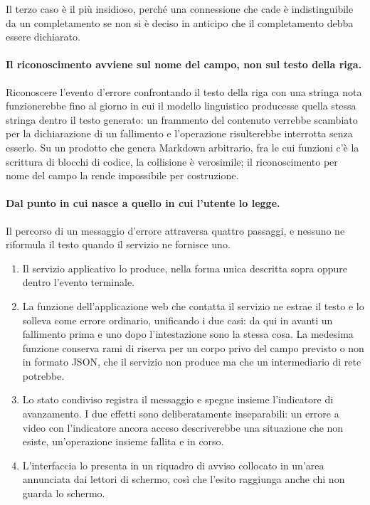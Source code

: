 \documentclass[a4paper, 10pt]{article}
\begin{document}
\noindent Il terzo caso è il più insidioso, perché una connessione che cade è indistinguibile da un completamento se non si è deciso in anticipo che il completamento debba essere dichiarato.

\paragraph{Il riconoscimento avviene sul nome del campo, non sul testo della riga.}
Riconoscere l'evento d'errore confrontando il testo della riga con una stringa nota funzionerebbe fino al giorno in cui il modello linguistico producesse quella stessa stringa dentro il testo generato: un frammento del contenuto verrebbe scambiato per la dichiarazione di un fallimento e l'operazione risulterebbe interrotta senza esserlo. Su un prodotto che genera Markdown arbitrario, fra le cui funzioni c'è la scrittura di blocchi di codice, la collisione è verosimile; il riconoscimento per nome del campo la rende impossibile per costruzione.

\paragraph{Dal punto in cui nasce a quello in cui l'utente lo legge.}
Il percorso di un messaggio d'errore attraversa quattro passaggi, e nessuno ne riformula il testo quando il servizio ne fornisce uno.

\begin{enumerate}
    \setlength{\itemsep}{3pt}
    \item Il servizio applicativo lo produce, nella forma unica descritta sopra oppure dentro l'evento terminale.
    \item La funzione dell'applicazione web che contatta il servizio ne estrae il testo e lo solleva come errore ordinario, unificando i due casi: da qui in avanti un fallimento prima e uno dopo l'intestazione sono la stessa cosa. La medesima funzione conserva rami di riserva per un corpo privo del campo previsto o non in formato JSON, che il servizio non produce ma che un intermediario di rete potrebbe.
    \item Lo stato condiviso registra il messaggio e spegne insieme l'indicatore di avanzamento. I due effetti sono deliberatamente inseparabili: un errore a video con l'indicatore ancora acceso descriverebbe una situazione che non esiste, un'operazione insieme fallita e in corso.
    \item L'interfaccia lo presenta in un riquadro di avviso collocato in un'area annunciata dai lettori di schermo, così che l'esito raggiunga anche chi non guarda lo schermo.
\end{enumerate}
\end{document}
